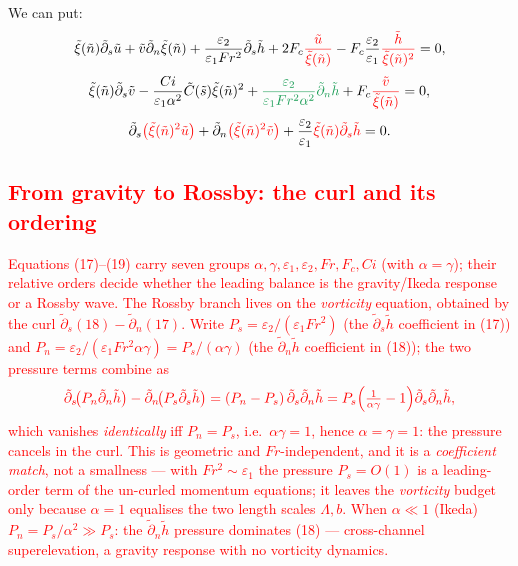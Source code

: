 \documentclass[11pt]{article}
\newcommand{\R}[1]{\textcolor{red}{#1}}
\newcommand{\G}[1]{\textcolor{ForestGreen}{#1}}
\newcommand{\dt}{\tilde{\partial}}
\begin{document}
We can put:
\begin{equation}
\tilde\xi(\tilde n)\dt_s\tilde u
 + \tilde v\dt_n\tilde\xi(\tilde n)
 + \frac{\varepsilon_2}{\varepsilon_1Fr^2}\dt_s\tilde h
 + 2F_c\R{\frac{\tilde u}{\tilde\xi(\tilde n)}}
 - F_c\frac{\varepsilon_2}{\varepsilon_1}
   \R{\frac{\tilde h}{\tilde\xi(\tilde n)^2}} = 0,
\end{equation}
\begin{equation}
\tilde\xi(\tilde n)\dt_s\tilde v
 - \frac{Ci}{\varepsilon_1\alpha^2}\tilde C(\tilde s)\tilde\xi(\tilde n)^2
 + \G{\frac{\varepsilon_2}{\varepsilon_1Fr^2\alpha^2}\dt_n\tilde h}
 + F_c\R{\frac{\tilde v}{\tilde\xi(\tilde n)}} = 0,
\end{equation}
\begin{equation}
\dt_s\R{\bigl(\tilde\xi(\tilde n)^2\tilde u\bigr)}
 + \dt_n\R{\bigl(\tilde\xi(\tilde n)^2\tilde v\bigr)}
 + \frac{\varepsilon_2}{\varepsilon_1}
   \R{\tilde\xi(\tilde n)\dt_s\tilde h} = 0 .
\end{equation}

\R{\subsection*{From gravity to Rossby: the curl and its ordering}}

\R{Equations (17)--(19) carry seven groups $\alpha,\gamma,\varepsilon_1,
\varepsilon_2,Fr,F_c,Ci$ (with $\alpha=\gamma$); their relative orders decide
whether the leading balance is the gravity/Ikeda response or a Rossby wave. The
Rossby branch lives on the \emph{vorticity} equation, obtained by the curl
$\dt_s(18)-\dt_n(17)$. Write $P_s=\varepsilon_2/(\varepsilon_1Fr^2)$ (the
$\dt_s\tilde h$ coefficient in (17)) and
$P_n=\varepsilon_2/(\varepsilon_1Fr^2\alpha\gamma)=P_s/(\alpha\gamma)$ (the
$\dt_n\tilde h$ coefficient in (18)); the two pressure terms combine as}
\begin{equation*}
\R{\dt_s\!\big(P_n\dt_n\tilde h\big)-\dt_n\!\big(P_s\dt_s\tilde h\big)
 =(P_n-P_s)\,\dt_s\dt_n\tilde h
 =P_s\Big(\tfrac{1}{\alpha\gamma}-1\Big)\dt_s\dt_n\tilde h ,}
\end{equation*}
\R{which vanishes \emph{identically} iff $P_n=P_s$, i.e.\ $\boxed{\alpha\gamma=1}$,
hence $\alpha=\gamma=1$: the pressure cancels in the curl. This is geometric and
$Fr$-independent, and it is a \emph{coefficient match}, not a smallness --- with
$Fr^2\sim\varepsilon_1$ the pressure $P_s=O(1)$ is a leading-order term of the
un-curled momentum equations; it leaves the \emph{vorticity} budget only because
$\alpha=1$ equalises the two length scales $\Lambda,b$. When $\alpha\ll1$ (Ikeda)
$P_n=P_s/\alpha^2\gg P_s$: the $\dt_n\tilde h$ pressure dominates (18) ---
cross-channel superelevation, a gravity response with no vorticity dynamics.}
\end{document}
